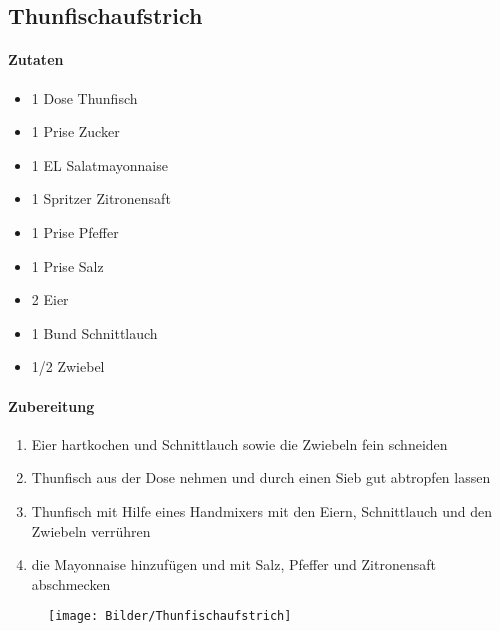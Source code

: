 \newpage
\subsection{Thunfischaufstrich}
\paragraph{Zutaten}
\begin{itemize}[noitemsep]
	\item 1 Dose Thunfisch
	\item 1 Prise Zucker
	\item 1 EL Salatmayonnaise
	\item 1 Spritzer Zitronensaft
	\item 1 Prise Pfeffer
	\item 1 Prise Salz
	\item 2 Eier
	\item 1 Bund Schnittlauch
	\item 1/2 Zwiebel
\end{itemize}
\paragraph{Zubereitung}
\begin{enumerate}[noitemsep]
	\item Eier hartkochen und Schnittlauch sowie die Zwiebeln fein schneiden
	\item Thunfisch aus der Dose nehmen und durch einen Sieb gut abtropfen lassen
	\item Thunfisch mit Hilfe eines Handmixers mit den Eiern, Schnittlauch und den Zwiebeln verrühren
	\item die Mayonnaise hinzufügen und mit Salz, Pfeffer und Zitronensaft abschmecken
\end{enumerate}
\begin{figure}[h]
\centering
\texttt{[image: Bilder/Thunfischaufstrich]}
\end{figure}